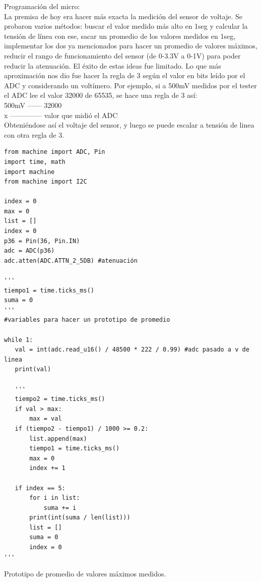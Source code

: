 Programación del micro:\\

La premisa de hoy era hacer más exacta la medición del sensor de voltaje. Se probaron varios métodos: buscar el valor medido más alto en 1seg y calcular la tensión de línea con ese, sacar un promedio de los valores medidos en 1seg, implementar los dos ya mencionados para hacer un promedio de valores máximos, reducir el rango de funcionamiento del sensor (de 0-3.3V a 0-1V) para poder reducir la atenuación. El éxito de estas ideas fue limitado. Lo que más aproximación nos dio fue hacer la regla de 3 según el valor en bits leído por el ADC y considerando un voltímero. Por ejemplo, si a 500mV medidos por el tester el ADC lee el valor 32000 de 65535, se hace una regla de 3 así:\\

500mV —--- 32000\\
x —----------- valor que midió el ADC\\

Obteniéndose así el voltaje del sensor, y luego se puede escalar a tensión de linea con otra regla de 3.\\

\begin{listing}[H]
\begin{verbatim}
from machine import ADC, Pin
import time, math
import machine
from machine import I2C

index = 0
max = 0
list = []
index = 0
p36 = Pin(36, Pin.IN)
adc = ADC(p36)
adc.atten(ADC.ATTN_2_5DB) #atenuación

'''
tiempo1 = time.ticks_ms()
suma = 0
'''
#variables para hacer un prototipo de promedio

while 1:
   val = int(adc.read_u16() / 48500 * 222 / 0.99) #adc pasado a v de linea
   print(val)

   '''
   tiempo2 = time.ticks_ms()
   if val > max:
       max = val
   if (tiempo2 - tiempo1) / 1000 >= 0.2:
       list.append(max)
       tiempo1 = time.ticks_ms()
       max = 0
       index += 1
      
   if index == 5:
       for i in list:
           suma += i
       print(int(suma / len(list)))
       list = []
       suma = 0
       index = 0
'''

\end{verbatim}
\caption{Prototipo de promedio de valores máximos medidos.}
\label{Promedio valores medidos proto}
\end{listing}

